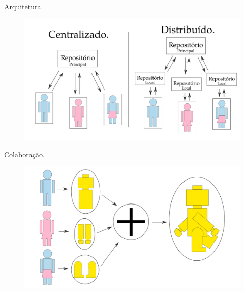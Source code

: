 \documentclass[brazil,aspectratio=169]{beamer}
\begin{document}
\begin{frame}{Arquitetura.}

  \begin{figure}
    \centering
    \includegraphics[scale=0.35]{imagens/arquitetura}
  \end{figure}
  
\end{frame}

\begin{frame}{Colaboração.}

  \begin{figure}
    \centering
    \includegraphics[scale=0.35]{imagens/colaboracao}
  \end{figure}
  
\end{frame}
\end{document}
